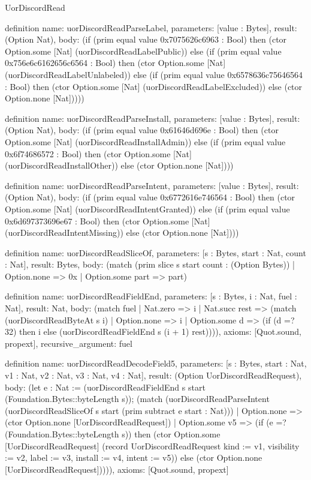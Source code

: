 \begin{lexlean}{UorDiscordRead}
\begin{semanticmodule}
definition{
  name: uorDiscordReadParseLabel,
  parameters: [value : Bytes],
  result: (Option Nat),
  body: (if (prim equal value 0x7075626c6963 : Bool) then (ctor Option.some [Nat] (uorDiscordReadLabelPublic)) else (if (prim equal value 0x756e6c6162656c6564 : Bool) then (ctor Option.some [Nat] (uorDiscordReadLabelUnlabeled)) else (if (prim equal value 0x6578636c75646564 : Bool) then (ctor Option.some [Nat] (uorDiscordReadLabelExcluded)) else (ctor Option.none [Nat]))))
}

definition{
  name: uorDiscordReadParseInstall,
  parameters: [value : Bytes],
  result: (Option Nat),
  body: (if (prim equal value 0x61646d696e : Bool) then (ctor Option.some [Nat] (uorDiscordReadInstallAdmin)) else (if (prim equal value 0x6f74686572 : Bool) then (ctor Option.some [Nat] (uorDiscordReadInstallOther)) else (ctor Option.none [Nat])))
}

definition{
  name: uorDiscordReadParseIntent,
  parameters: [value : Bytes],
  result: (Option Nat),
  body: (if (prim equal value 0x6772616e746564 : Bool) then (ctor Option.some [Nat] (uorDiscordReadIntentGranted)) else (if (prim equal value 0x6d697373696e67 : Bool) then (ctor Option.some [Nat] (uorDiscordReadIntentMissing)) else (ctor Option.none [Nat])))
}

definition{
  name: uorDiscordReadSliceOf,
  parameters: [s : Bytes, start : Nat, count : Nat],
  result: Bytes,
  body: (match (prim slice s start count : (Option Bytes))
    | Option.none => 0x
    | Option.some part => part)
}

definition{
  name: uorDiscordReadFieldEnd,
  parameters: [s : Bytes, i : Nat, fuel : Nat],
  result: Nat,
  body: (match fuel
    | Nat.zero => i
    | Nat.succ rest => (match (uorDiscordReadByteAt s i)
      | Option.none => i
      | Option.some d => (if (d =? 32) then i else (uorDiscordReadFieldEnd s (i + 1) rest)))),
  axioms: [Quot.sound, propext],
  recursive_argument: fuel
}

definition{
  name: uorDiscordReadDecodeField5,
  parameters: [s : Bytes, start : Nat, v1 : Nat, v2 : Nat, v3 : Nat, v4 : Nat],
  result: (Option UorDiscordReadRequest),
  body: (let e : Nat := (uorDiscordReadFieldEnd s start (Foundation.Bytes::byteLength s)); (match (uorDiscordReadParseIntent (uorDiscordReadSliceOf s start (prim subtract e start : Nat)))
    | Option.none => (ctor Option.none [UorDiscordReadRequest])
    | Option.some v5 => (if (e =? (Foundation.Bytes::byteLength s)) then (ctor Option.some [UorDiscordReadRequest] (record UorDiscordReadRequest {kind := v1, visibility := v2, label := v3, install := v4, intent := v5})) else (ctor Option.none [UorDiscordReadRequest])))),
  axioms: [Quot.sound, propext]
}


\end{semanticmodule}
\end{lexlean}
